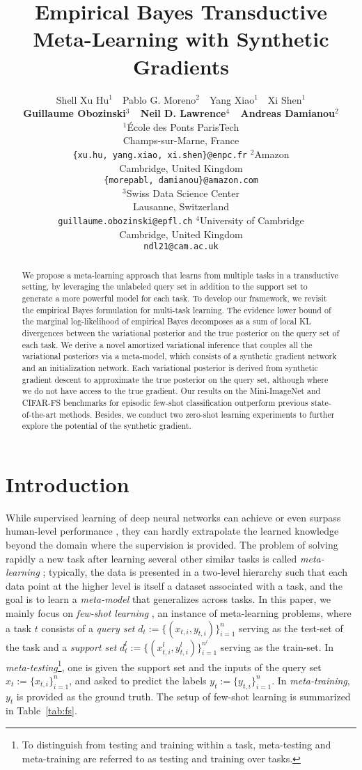 \documentclass{article} \usepackage{iclr2020_conference,times}
\title{Empirical Bayes Transductive Meta-Learning with Synthetic Gradients}
\author{
  Shell Xu Hu$^1$ \,\, Pablo G. Moreno$^2$ \,\, Yang Xiao$^1$ \,\, Xi Shen$^1$ \\
  \hspace{0.03mm} \textbf{Guillaume Obozinski$^3$ \,\, Neil D. Lawrence$^4$ \,\, Andreas Damianou$^2$}\\
    \And
  $^1$École des Ponts ParisTech \\
  Champs-sur-Marne, France \\
  \texttt{\{xu.hu, yang.xiao, xi.shen\}@enpc.fr} 
    \And
  $^2$Amazon \\
  Cambridge, United Kingdom \\
  \texttt{\{morepabl, damianou\}@amazon.com}\\
    \And
  $^3$Swiss Data Science Center \\
  Lausanne, Switzerland \\
  \texttt{guillaume.obozinski@epfl.ch}
    \And
  $^4$University of Cambridge \\
  Cambridge, United Kingdom \\
  \texttt{ndl21@cam.ac.uk}
}
\newcommand{\nt}{n}
\begin{document}
\maketitle


\begin{abstract}
We propose a meta-learning approach that learns from multiple tasks in a transductive setting, by leveraging the unlabeled query set in addition to the support set to generate a more powerful model for each task. To develop our framework, we revisit the empirical Bayes formulation for multi-task learning. The evidence lower bound of the marginal log-likelihood of empirical Bayes decomposes as a sum of local KL divergences between the variational posterior and the true posterior on the query set of each task.
    We derive a novel amortized variational inference that couples all the variational posteriors via a meta-model, which consists of a synthetic gradient network and an initialization network. Each variational posterior is derived from synthetic gradient descent to approximate the true posterior on the query set, although where we do not have access to the true gradient.  
Our results on the Mini-ImageNet and CIFAR-FS benchmarks for episodic few-shot classification outperform previous state-of-the-art methods.
    Besides, we conduct two zero-shot learning experiments to further explore the potential of the synthetic gradient.
\end{abstract}


\section{Introduction}




While supervised learning of deep neural networks can achieve or even surpass human-level performance \citep{he2015delving,devlin2018bert},
they can hardly extrapolate the learned knowledge beyond the domain where the supervision is provided.
The problem of solving rapidly a new task
after learning several other similar tasks is called \emph{meta-learning} \citep{schmidhuber1987,bengio1991learning,thrun1998learning}; typically, the data is presented in a two-level hierarchy such that each data point at the higher level is itself a dataset associated with a task,
and the goal is to learn a \emph{meta-model} that generalizes across tasks.
In this paper, we mainly focus on \emph{few-shot learning} \citep{vinyals2016matching}, an instance of meta-learning problems,
where a task $t$ consists of 
a \emph{query set} ${\displaystyle d_t := \{(x_{t,i}, y_{t,i})\}_{i=1}^{n}}$ serving as the test-set of the task
and a \emph{support set} ${\scriptstyle d_t^{l} := \{(x_{t,i}^{l}, y_{t,i}^{l})\}_{i=1}^{\nt^l}}$ serving as the train-set.
In \emph{meta-testing}\footnote{To distinguish from testing and training within a task, meta-testing and meta-training are referred to as testing and training over tasks.}, 
one is given the support set and the inputs of the query set $x_t := \{x_{t,i}\}_{i=1}^{\nt}$, and asked to predict the labels $y_t := \{ y_{t,i} \}_{i=1}^{\nt}$.
In \emph{meta-training}, $y_t$ is provided as the ground truth.
The setup of few-shot learning is summarized in Table~\ref{tab:fs}.
\end{document}
